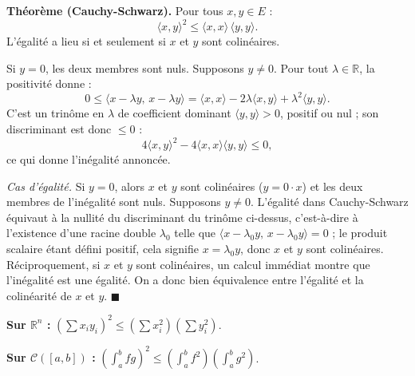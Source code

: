 \decsep{}


\begin{tcolorbox}[thmbox]
  \textbf{Théorème (Cauchy-Schwarz).}\enspace%
  Pour tous $x, y \in E$ :
  \[
    \langle x, y\rangle^2 \leq \langle x,x\rangle\,\langle y,y\rangle.
  \]
  L'égalité a lieu si et seulement si $x$ et $y$ sont colinéaires.
\end{tcolorbox}

\begin{mdframed}[style=proofbar]
  Si $y = 0$, les deux membres sont nuls. Supposons $y \neq 0$.
  Pour tout $\lambda \in \mathbb{R}$, la positivité donne :
  \[
    0 \leq \langle x - \lambda y,\, x - \lambda y\rangle
    = \langle x,x\rangle - 2\lambda\langle x,y\rangle + \lambda^2\langle y,y\rangle.
  \]
  C'est un trinôme en $\lambda$ de coefficient dominant $\langle y,y\rangle > 0$,
  positif ou nul ; son discriminant est donc $\leq 0$ :
  \[
    4\langle x,y\rangle^2 - 4\langle x,x\rangle\langle y,y\rangle \leq 0,
  \]
  ce qui donne l'inégalité annoncée.

  \smallskip
  \textit{Cas d'égalité.} Si $y = 0$, alors $x$ et $y$ sont colinéaires
  ($y = 0\cdot x$) et les deux membres de l'inégalité sont nuls. Supposons $y \neq 0$.
  L'égalité dans Cauchy-Schwarz équivaut à la nullité du discriminant du trinôme
  ci-dessus, c'est-à-dire à l'existence d'une racine double $\lambda_0$ telle que
  $\langle x - \lambda_0 y,\, x - \lambda_0 y\rangle = 0$ ; le produit scalaire
  étant défini positif, cela signifie $x = \lambda_0 y$, donc $x$ et $y$ sont
  colinéaires.
  Réciproquement, si $x$ et $y$ sont colinéaires, un calcul immédiat montre que
  l'inégalité est une égalité. On a donc bien équivalence entre l'égalité et la
  colinéarité de $x$ et $y$. $\blacksquare$
\end{mdframed}

\begin{mdframed}[style=exbar]
  \textbf{Sur $\mathbb{R}^n$ :}\enspace%
  $\left(\sum x_i y_i\right)^2 \leq \left(\sum x_i^2\right)\left(\sum y_i^2\right)$.

  \smallskip\noindent
  \textbf{Sur $\mathcal{C}([a,b])$ :}\enspace%
  $\left(\int_a^b fg\right)^2 \leq \left(\int_a^b f^2\right)\left(\int_a^b g^2\right)$.
\end{mdframed}

